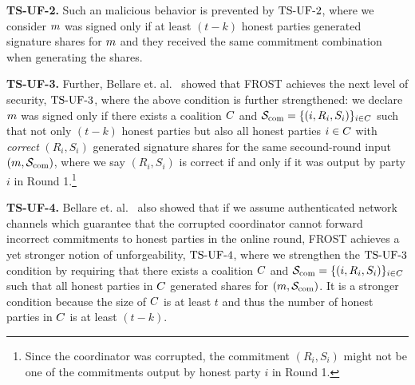 
\medskip

\textbf{TS-UF-2.}
Such an malicious behavior is prevented by $\mathrm{TS}\mbox{-}\mathrm{UF}\mbox{-}{2}$, where
we consider $m$ was signed only if at least $(t - k)$ honest parties generated signature shares for $m$ and they received the same commitment combination when generating the shares.

\medskip

\textbf{TS-UF-3.} Further, Bellare et. al.~\cite{BellareCKMTZ22} showed that FROST achieves the next level of security, $\mathrm{TS}\mbox{-}\mathrm{UF}\mbox{-}{3}$, where the above condition is further strengthened:
we declare $m$ was signed only if there exists a coalition $C$ and $\mathcal{S}_{\rm com}=\{ (i, R_{i}, S_{i})\}_{i \in C}$ such that not only $(t - k)$ honest parties but also all honest parties $i\in C$ with \emph{correct} $(R_{i}, S_{i})$ generated signature shares for the same secound-round input $(m, \mathcal{S}_{\rm com})$, where we say $(R_{i}, S_{i})$ is correct if and only if it was output by party $i$ in Round 1.\footnote{Since the coordinator was corrupted, the commitment $(R_{i}, S_{i})$ might not be one of the commitments output by honest party $i$ in Round 1.}


\medskip

\textbf{TS-UF-4.} Bellare et. al.~\cite{BellareCKMTZ22} also showed that if we assume authenticated network channels which guarantee that the corrupted coordinator cannot forward incorrect commitments to honest parties in the online round, FROST achieves a yet stronger notion of unforgeability, $\mathrm{TS}\mbox{-}\mathrm{UF}\mbox{-}{4}$, where we strengthen the $\mathrm{TS}\mbox{-}\mathrm{UF}\mbox{-}{3}$ condition by requiring that there exists a coalition $C$ and $\mathcal{S}_{\rm com}=\{ (i, R_{i}, S_{i})\}_{i \in C}$ such that all honest parties in $C$ generated shares for $(m, \mathcal{S}_{\rm com})$.
It is a stronger condition because the size of $C$ is at least $t$ and thus the number of honest parties in $C$ is at least $(t - k)$.

